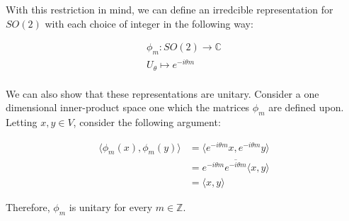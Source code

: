\documentclass[10pt]{ucthesis}
\newcommand{\Z}{\mathbb{Z}}
\newcommand{\C}{\mathbb{C}}
\begin{document}
With this restriction in mind, we can define an irredcible representation for $SO(2)$ with each choice of integer in the following way:

$$\begin{aligned}
	\phi_m:SO(2)\rightarrow \C \\
	U_\theta \mapsto e^{-i\theta m} \\
\end{aligned}$$

We can also show that these representations are unitary. Consider a one dimensional inner-product space one which the matrices $\phi_m$ are defined upon. Letting $x,y\in V$, consider the following argument:

\begin{equation}
	\begin{aligned}
		\langle \phi_m(x) , \phi_m(y) \rangle &= \langle e^{-i\theta m}x , e^{-i\theta m}y \rangle \\
												&= e^{-i\theta m}\overline{e^{-i\theta m}} \langle x , y \rangle\\
												&=\langle x , y \rangle
	\end{aligned}
\end{equation}

Therefore, $\phi_m$ is unitary for every $m\in\Z$. 



\end{document}
